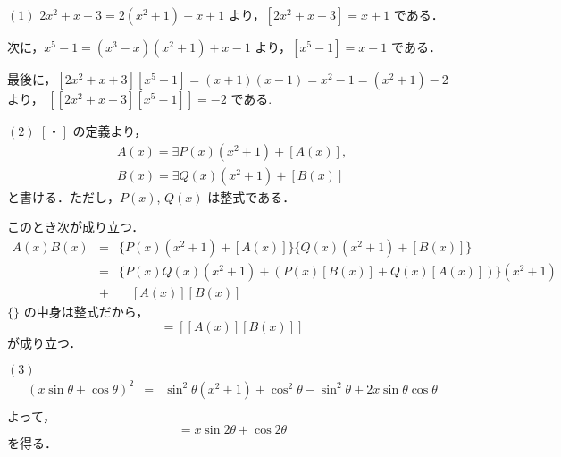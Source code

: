 \documentclass[main]{subfiles}
\begin{document}
\setcounter{prob}{3}
\begin{prob}

\end{prob}
\begin{pf}
$(1)$ $2x^2+x+3 =2(x^2+1)+x+1$ より，$[2x^2+x+3] = x+1$ である．

次に，$x^5-1 = (x^3-x)(x^2+1)+x-1$ より，$[x^5-1] = x-1$ である．

最後に，$[2x^2+x+3][x^5-1] = (x+1)(x-1) = x^2-1 = (x^2+1)-2$ より，
$[[2x^2+x+3][x^5-1]] = -2$ である. 

$(2)$ $[・]$ の定義より， 
\begin{eqnarray*}
A(x) = \exists P(x)(x^2+1)+[A(x)], \\
B(x) = \exists Q(x)(x^2+1)+[B(x)]
\end{eqnarray*}
と書ける．ただし，$P(x)$, $Q(x)$ は整式である．

このとき次が成り立つ．
\begin{eqnarray*}
A(x)B(x) &=& \{P(x)(x^2+1)+[A(x)]\}\{Q(x)(x^2+1)+[B(x)]\} \\
				&=& \{P(x)Q(x)(x^2+1)+(P(x)[B(x)]+Q(x)[A(x)])\}(x^2+1) \\ 
				                                                        &+& \quad [A(x)][B(x)]
\end{eqnarray*}
$\{\}$ の中身は整式だから，
\begin{equation*}
[A(x)][B(x)] = [[A(x)][B(x)]]
\end{equation*}
が成り立つ．

$(3)$
\begin{eqnarray*}
(x\sin\theta+\cos\theta)^2 &=& \sin^2\theta(x^2+1)+
										\cos^2\theta-\sin^2\theta+2x\sin\theta\cos\theta \\
\end{eqnarray*}
よって，
\begin{equation*}
[(x\sin\theta+\cos\theta)^2] = x\sin2\theta+\cos2\theta 
\end{equation*}
を得る．


\end{pf}
\end{document}
